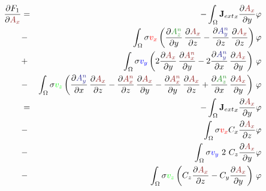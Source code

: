 \documentclass[smallextended]{svjour3}       %
\begin{document}
			\begin{eqnarray}
			\frac{\partial F_1}{\partial \textcolor{darkred}{A_x}} & = &
			-\int_{\Omega} {\mathbf{J}_{ext}}_x \frac{\partial \textcolor{darkred}{A_x}}{\partial y} \varphi				
			\nonumber \\
			& - &\int_{\Omega} \sigma \textcolor{red}{v_x} \left(
				\frac{\partial \textcolor{darkgre}{A_z^n}}{\partial y}\,\frac{\partial \textcolor{darkred}{A_x}}{\partial z}
				- \frac{\partial \textcolor{darkblu}{A_y^n}}{\partial z}\,\frac{\partial \textcolor{darkred}{A_x}}{\partial z}
				\right) \varphi \nonumber \\			
			& + & \int_{\Omega} \sigma \textcolor{blu}{v_y} \left( 2 \frac{\partial \textcolor{darkred}{A_x}}{\partial y}\,\frac{\partial \textcolor{darkred}{A_x^n}}{\partial y} - 2 \frac{\partial \textcolor{darkblu}{A_y^n}}{\partial x}\,\frac{\partial \textcolor{darkred}{A_x}}{\partial y} \right)\, \varphi \nonumber \\		
			& - & \int_{\Omega} \sigma \textcolor{gre}{v_z} \left(\frac{\partial \textcolor{darkblu}{A_y^n}}{\partial x}\,\frac{\partial \textcolor{darkred}{A_x}}{\partial z} - \frac{\partial \textcolor{darkred}{A_x^n}}{\partial z}\,\frac{\partial \textcolor{darkred}{A_x}}{\partial y} - \frac{\partial \textcolor{darkred}{A_x^n}}{\partial y}\,\frac{\partial \textcolor{darkred}{A_x}}{\partial z} + \frac{\partial \textcolor{darkgre}{A_z^n}}{\partial x}\,\frac{\partial \textcolor{darkred}{A_x}}{\partial y} \right)\, \varphi\\
			 & = &
			-\int_{\Omega} {\mathbf{J}_{ext}}_x \frac{\partial \textcolor{darkred}{A_x}}{\partial y} \varphi	
			\nonumber \\
			& - &\int_{\Omega} \sigma  \textcolor{red}{v_x}    C_x \frac{\partial \textcolor{darkred}{A_x}}{\partial z} \varphi \nonumber \\			
			& - & \int_{\Omega} \sigma \textcolor{blu}{v_y}\ 2\ C_z \frac{\partial \textcolor{darkred}{A_x}}{\partial y} \varphi \nonumber \\			
			& - & \int_{\Omega} \sigma \textcolor{gre}{v_z}    \left( C_z \frac{\partial \textcolor{darkred}{A_x}}{\partial z} - C_y \frac{\partial \textcolor{darkred}{A_x}}{\partial y}\right)\, \varphi
						\end{eqnarray}
						
\end{document}
